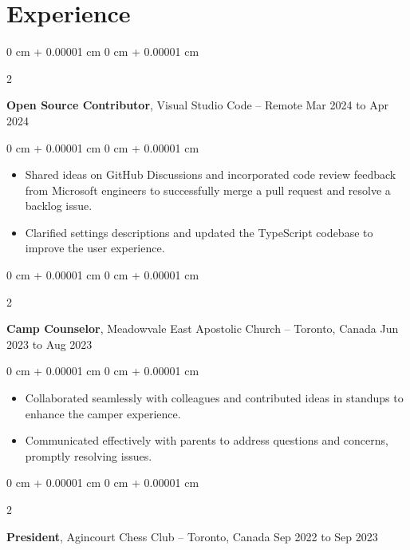 \documentclass[10pt, letterpaper]{article}
\newenvironment{highlights}{
    \begin{itemize}[
        topsep=0.10 cm,
        parsep=0.10 cm,
        partopsep=0pt,
        itemsep=0pt,
        leftmargin=0 cm + 10pt
    ]
}{
    \end{itemize}
} %
\newenvironment{onecolentry}{
    \begin{adjustwidth}{
        0 cm + 0.00001 cm
    }{
        0 cm + 0.00001 cm
    }
}{
    \end{adjustwidth}
} %
\newenvironment{twocolentry}[2][]{
    \onecolentry
    \def\secondColumn{#2}
    \setcolumnwidth{\fill, 4.5 cm}
    \begin{paracol}{2}
}{
    \switchcolumn \raggedleft \secondColumn
    \end{paracol}
    \endonecolentry
} %
\begin{document}
    
    \section{Experience}



        
        \begin{twocolentry}{
            Mar 2024 to Apr 2024
        }
            \textbf{Open Source Contributor}, Visual Studio Code -- Remote\end{twocolentry}

        \vspace{0.10 cm}
        \begin{onecolentry}
            \begin{highlights}
                \item Shared ideas on GitHub Discussions and incorporated code review feedback from Microsoft engineers to successfully merge a pull request and resolve a backlog issue.
                \item Clarified settings descriptions and updated the TypeScript codebase to improve the user experience.
            \end{highlights}
        \end{onecolentry}


        \vspace{0.2 cm}

        \begin{twocolentry}{
            Jun 2023 to Aug 2023
        }
            \textbf{Camp Counselor}, Meadowvale East Apostolic Church -- Toronto, Canada\end{twocolentry}

        \vspace{0.10 cm}
        \begin{onecolentry}
            \begin{highlights}
                \item Collaborated seamlessly with colleagues and contributed ideas in standups to enhance the camper experience.
                \item Communicated effectively with parents to address questions and concerns, promptly resolving issues.
            \end{highlights}
        \end{onecolentry}


        \vspace{0.2 cm}

        \begin{twocolentry}{
            Sep 2022 to Sep 2023
        }
            \textbf{President}, Agincourt Chess Club -- Toronto, Canada\end{twocolentry}
\end{document}
